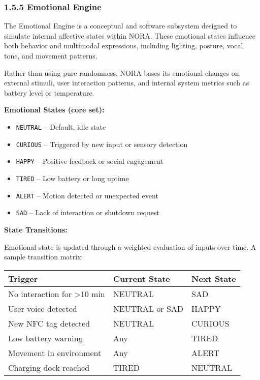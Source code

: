 \subsubsection*{1.5.5 Emotional Engine}

The Emotional Engine is a conceptual and software subsystem designed to simulate internal affective states within NORA. These emotional states influence both behavior and multimodal expressions, including lighting, posture, vocal tone, and movement patterns.

Rather than using pure randomness, NORA bases its emotional changes on external stimuli, user interaction patterns, and internal system metrics such as battery level or temperature.

\vspace{0.5cm}

\noindent\textbf{Emotional States (core set):}
\begin{itemize}
    \item \texttt{NEUTRAL} – Default, idle state
    \item \texttt{CURIOUS} – Triggered by new input or sensory detection
    \item \texttt{HAPPY} – Positive feedback or social engagement
    \item \texttt{TIRED} – Low battery or long uptime
    \item \texttt{ALERT} – Motion detected or unexpected event
    \item \texttt{SAD} – Lack of interaction or shutdown request
\end{itemize}

\vspace{0.5cm}

\noindent\textbf{State Transitions:}

Emotional state is updated through a weighted evaluation of inputs over time. A sample transition matrix:

\begin{center}
\begin{tabular}{|l|l|l|}
\hline
\textbf{Trigger} & \textbf{Current State} & \textbf{Next State} \\
\hline
No interaction for >10 min & NEUTRAL & SAD \\
User voice detected & NEUTRAL or SAD & HAPPY \\
New NFC tag detected & NEUTRAL & CURIOUS \\
Low battery warning & Any & TIRED \\
Movement in environment & Any & ALERT \\
Charging dock reached & TIRED & NEUTRAL \\
\hline
\end{tabular}
\end{center}

